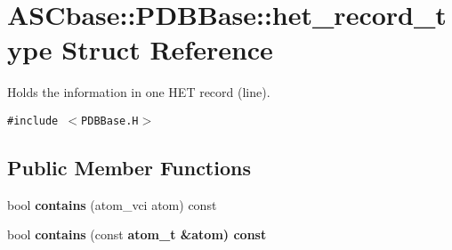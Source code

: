 \section{ASCbase::PDBBase::het\_\-record\_\-type Struct Reference}
\label{structASCbase_1_1PDBBase_1_1het__record__type}
Holds the information in one HET record (line).  


{\tt \#include $<$PDBBase.H$>$}

\subsection*{Public Member Functions}
\begin{CompactItemize}
\item 
bool \textbf{contains} (atom\_\-vci atom) const \label{structASCbase_1_1PDBBase_1_1het__record__type_bc330509162725271ba3ea107759b095}

\item 
bool \textbf{contains} (const \bf{atom\_\-t} \&atom) const \label{structASCbase_1_1PDBBase_1_1het__record__type_0b9716fa4db07e2c1f2fb6de9824462b}

\end{CompactItemize}
